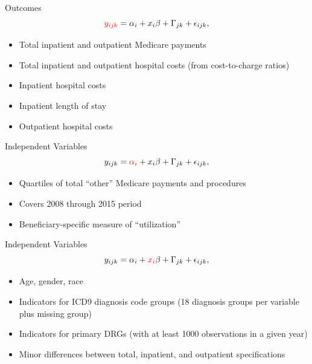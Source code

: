 \documentclass[t,aspectratio=169]{beamer}
\begin{document}
\begin{frame}{Outcomes}
    \begin{equation*}
        \textcolor{red}{y_{ijk}} = \alpha_{i} + x_{i}\beta + \Gamma_{jk} + \epsilon_{ijk},
    \end{equation*}

    \begin{itemize}
        \item Total inpatient and outpatient Medicare payments
        \item Total inpatient and outpatient hospital costs (from cost-to-charge ratios)
        \item Inpatient hospital costs
        \item Inpatient length of stay
        \item Outpatient hospital costs
    \end{itemize}
\end{frame}


\begin{frame}{Independent Variables}
    \begin{equation*}
        y_{ijk} = \textcolor{red}{\alpha_{i}} + x_{i}\beta + \Gamma_{jk} + \epsilon_{ijk},
    \end{equation*}

    \begin{itemize}
        \item Quartiles of total ``other'' Medicare payments and procedures
        \item Covers 2008 through 2015 period
        \item Beneficiary-specific measure of ``utilization''
    \end{itemize}
\end{frame}

\begin{frame}{Independent Variables}
    \begin{equation*}
        y_{ijk} = \alpha_{i} + \textcolor{red}{x_{i}}\beta + \Gamma_{jk} + \epsilon_{ijk},
    \end{equation*}

    \begin{itemize}
        \item Age, gender, race
        \item Indicators for ICD9 diagnosis code groups (18 diagnosis groups per variable plus missing group)
        \item Indicators for primary DRGs (with at least 1000 observations in a given year)
        \item Minor differences between total, inpatient, and outpatient specifications
    \end{itemize}
\end{frame}
\end{document}
